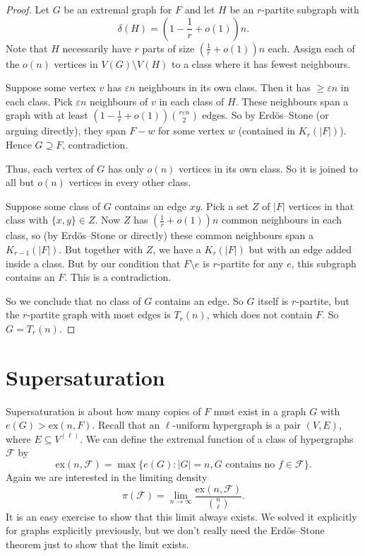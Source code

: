 \documentclass[a4paper]{article}
\renewcommand\ex{\mathrm{ex}}
\begin{document}
\begin{proof}
  Let $G$ be an extremal graph for $F$ and let $H$ be an $r$-partite subgraph with
  \[
    \delta(H) = \left(1 - \frac{1}{r} + o(1)\right)n.
  \]
  Note that $H$ necessarily have $r$ parts of size $\left(\frac{1}{r} + o(1)\right)n$ each. Assign each of the $o(n)$ vertices in $V(G) \setminus V(H)$ to a class where it has fewest neighbours.

  Suppose some vertex $v$ has $\varepsilon n$ neighbours in its own class. Then it has $\geq \varepsilon n$ in each class. Pick $\varepsilon n$ neighbours of $v$ in each class of $H$. These neighbours span a graph with at least $\left(1 -\frac{1}{r} + o(1)\right) \binom{r\varepsilon n}{2}$ edges. So by Erd\"os--Stone (or arguing directly), they span $F - w$ for some vertex $w$ (contained in $K_r(|F|)$). Hence $G \supseteq F$, contradiction.

  Thus, each vertex of $G$ has only $o(n)$ vertices in its own class. So it is joined to all but $o(n)$ vertices in every other class.

  Suppose some class of $G$ contains an edge $xy$. Pick a set $Z$ of $|F|$ vertices in that class with $\{x, y\} \in Z$. Now $Z$ has $\left(\frac{1}{r} + o(1)\right)n$ common neighbours in each class, so (by Erd\"os--Stone or directly) these common neighbours span a $K_{r - 1}(|F|)$. But together with $Z$, we have a $K_r(|F|)$ but with an edge added inside a class. But by our condition that $F \setminus e$ is $r$-partite for any $e$, this subgraph contains an $F$. This is a contradiction.

  So we conclude that no class of $G$ contains an edge. So $G$ itself is $r$-partite, but the $r$-partite graph with most edges is $T_r(n)$, which does not contain $F$. So $G = T_r(n)$.
\end{proof}

\section{Supersaturation}
Supersaturation is about how many copies of $F$ must exist in a graph $G$ with $e(G) > \ex(n, F)$. Recall that an $\ell$-uniform hypergraph is a pair $(V, E)$, where $E \subseteq V^{(\ell)}$. We can define the extremal function of a class of hypergraphs $\mathcal{F}$ by
\[
  \ex(n, \mathcal{F}) = \max \{e(G): |G| = n, \text{$G$ contains no $f \in \mathcal{F}$}\}.
\]
Again we are interested in the limiting density
\[
  \pi(\mathcal{F}) = \lim_{n \to \infty} \frac{\ex(n, \mathcal{F})}{\binom{n}{\ell}}.
\]
It is an easy exercise to show that this limit always exists. We solved it explicitly for graphs explicitly previously, but we don't really need the Erd\"os--Stone theorem just to show that the limit exists.
\end{document}
